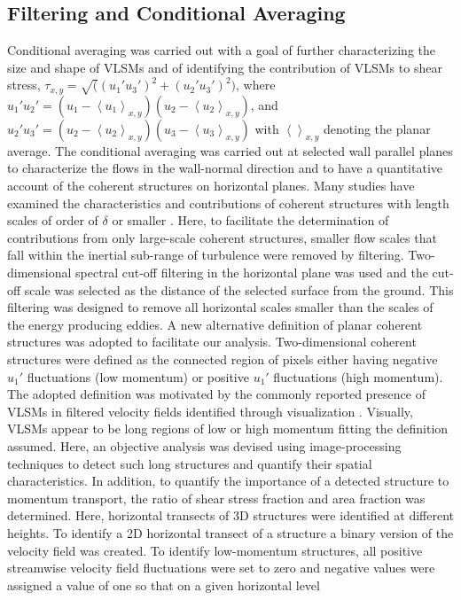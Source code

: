 \subsection{Filtering and Conditional Averaging}
Conditional averaging was carried out with a goal of further characterizing the size and shape of VLSMs and of identifying the contribution of VLSMs to shear stress, $\tau_{x,y} = \sqrt((u_{1}'u_{3}')^2+(u_{2}'u_{3}')^2)$, where $u_{1}'u_{2}'= (u_{1} -\left< u_{1}\right >_{x,y})(u_{2} -\left< u_{2}\right >_{x,y})$, and $u_{2}'u_{3}'= (u_2 -\left< u_{2}\right >_{x,y})(u_{3} -\left< u_{3}\right >_{x,y})$ with $\left < \right >_{x,y}$ denoting the planar average. The conditional averaging was carried out at selected wall parallel planes to characterize the flows in the wall-normal direction and to have a quantitative account of the coherent structures on horizontal planes. Many studies have examined  the characteristics and contributions of coherent structures with length scales of order of $\delta$ or smaller \citep{}. Here, to facilitate the determination of contributions from only large-scale coherent structures, smaller flow scales that  fall within the inertial sub-range of turbulence were removed by filtering.  Two-dimensional spectral cut-off filtering in the horizontal plane was used and the cut-off scale was selected as the distance of the selected surface from the ground. This filtering was designed to remove all horizontal scales smaller than the scales  of the energy producing eddies.  A new alternative definition of planar coherent structures was adopted to facilitate our analysis. Two-dimensional coherent structures were defined as the connected region of pixels either having negative $u_{1}'$ fluctuations (low momentum) or positive $u_{1}'$ fluctuations (high momentum). The adopted definition was motivated by the commonly reported presence of VLSMs in filtered velocity fields identified through visualization \citep{hutchins_marusic_jfm2007,dennis_nickels_jfm2011}.  Visually, VLSMs appear to be long regions of low or high momentum fitting the definition assumed.  Here, an objective analysis was devised using image-processing techniques to detect such long structures and quantify their spatial characteristics. In addition, to quantify the importance of a detected structure to momentum transport, the ratio of shear stress fraction and area fraction was determined.  Here, horizontal transects of 3D structures were identified at different heights. To identify a 2D horizontal transect of a structure a binary version of the velocity field was created. To identify low-momentum structures, all positive streamwise velocity field fluctuations were set to zero and negative values were assigned a value of one so that on a given horizontal level 


